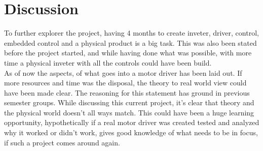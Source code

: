 \section{Discussion}
To further explorer the project, having 4 months to create inveter, driver, control, embedded control and a physical product is a big task. This was also been stated before the project started, and while having done what was possible, with more time a physical inveter with all the controls could have been build. \\

As of now the aspects, of what goes into a motor driver has been laid out. If more resources and time was the disposal, the theory to real world view could have been made clear. The reasoning for this statement has ground in previous semester groups. While discussing this current project, it's clear that theory and the physical world doesn't all ways match. This could have been a huge learning opportunity, hypothetically if a real motor driver was created tested and analyzed why it worked or didn't work, gives good knowledge of what needs to be in focus, if such a project comes around again. \\

 